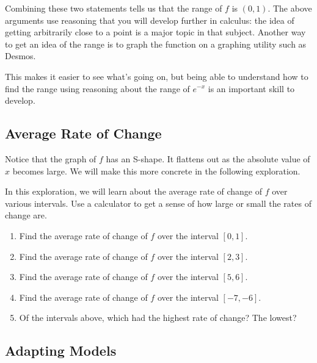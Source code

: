 \documentclass{ximera}
\begin{document}
Combining these two statements tells us that the range of $f$ is $(0, 1)$. The above arguments use reasoning that you will develop further in calculus: the idea of getting arbitrarily close to a point is a major topic in that subject. Another way to get an idea of the range is to graph the function on a graphing utility such as Desmos. 

\begin{image}
\end{image}

This makes it easier to see what's going on, but being able to understand how to find the range using reasoning about the range of $e^{-x}$ is an important skill to develop. 

\subsection{Average Rate of Change}
Notice that the graph of $f$ has an S-shape. It flattens out as the absolute value of $x$ becomes large. We will make this more concrete in the following exploration.
\begin{exploration}
In this exploration, we will learn about the average rate of change of $f$ over various intervals. Use a calculator to get a sense of how large or small the rates of change are. 
	\begin{enumerate}[label=\alph*.]
	\item Find the average rate of change of $f$ over the interval $[0, 1]$. 
	\item Find the average rate of change of $f$ over the interval $[2, 3]$. 
	\item Find the average rate of change of $f$ over the interval $[5, 6]$. 
	\item Find the average rate of change of $f$ over the interval $[-7, -6]$. 
	\item Of the intervals above, which had the highest rate of change? The lowest?
	\end{enumerate}
\end{exploration}

\subsection{Adapting Models}
\end{document}
